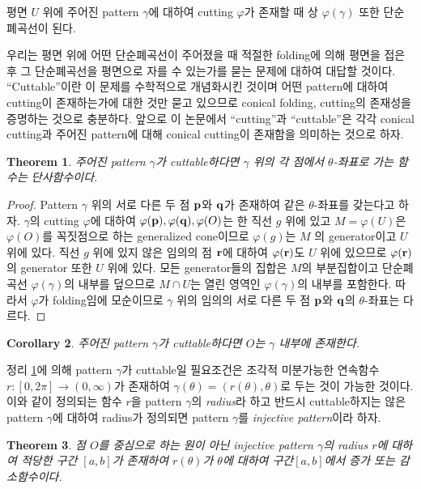 \documentclass{amsart}
\theoremstyle{plain}
\newtheorem{theorem}{Theorem}[section]
\newtheorem{corollary}[theorem]{Corollary}
\theoremstyle{definition}
\theoremstyle{remark}
\begin{document}
평면 $U$ 위에 주어진 pattern $\gamma$에 대하여 cutting $\varphi$가 존재할 때 상 $\varphi(\gamma)$ 또한 단순폐곡선이 된다.

우리는 평면 위에 어떤 단순폐곡선이 주어졌을 때 적절한 folding에 의해 평면을 접은 후 그 단순폐곡선을 평면으로 자를 수 있는가를 묻는 문제에 대하여 대답할 것이다.
``Cuttable''이란 이 문제를 수학적으로 개념화시킨 것이며 어떤 pattern에 대하여 cutting이 존재하는가에 대한 것만 묻고 있으므로 conical folding, cutting의 존재성을 증명하는 것으로 충분하다.
앞으로 이 논문에서 ``cutting''과 ``cuttable''은 각각 conical cutting과 주어진 pattern에 대해 conical cutting이 존재함을 의미하는 것으로 하자.

\begin{theorem}\label{nec1}%
주어진 pattern $\gamma$가 cuttable하다면 $\gamma$ 위의 각 점에서 $\theta$-좌표로 가는 함수는 단사함수이다.
\end{theorem}

\begin{proof}
Pattern $\gamma$ 위의 서로 다른 두 점 ${\bold p}$와 ${\bold q}$가 존재하여 같은 $\theta$-좌표를 갖는다고 하자.
$\gamma$의 cutting $\varphi$에 대하여 $\varphi({\bold p}),\varphi({\bold q}),\varphi(O)$는 한 직선 $g$ 위에 있고 $M=\varphi(U)$은 $\varphi(O)$를 꼭짓점으로 하는 generalized cone이므로 $\varphi(g)$는 $M$ 의 generator이고 $U$ 위에 있다.
직선 $g$ 위에 있지 않은 임의의 점 ${\bold r}$에 대하여 $\varphi({\bold r})$도 $U$ 위에 있으므로 $\varphi({\bold r})$의 generator 또한 $U$ 위에 있다.
모든 generator들의 집합은 $M$의 부분집합이고 단순폐곡선 $\varphi(\gamma)$의 내부를 덮으므로 $M\cap U$는 열린 영역인 $\varphi(\gamma)$의 내부를 포함한다.
따라서 $\varphi$가 folding임에 모순이므로 $\gamma$ 위의 임의의 서로 다른 두 점 ${\bold p}$와 ${\bold q}$의 $\theta$-좌표는 다르다.
\end{proof}

\begin{corollary}%
주어진 pattern $\gamma$가 cuttable하다면 $O$는 $\gamma$ 내부에 존재한다.
\end{corollary}

정리 \ref{nec1}에 의해 pattern $\gamma$가 cuttable일 필요조건은 조각적 미분가능한 연속함수 $r : [0,2\pi]\to (0,\infty)$가 존재하여 $\gamma(\theta)=(r(\theta),\theta)$로 두는 것이 가능한 것이다.
이와 같이 정의되는 함수 $r$을 pattern $\gamma$의 {\it radius}라 하고 반드시 cuttable하지는 않은 pattern $\gamma$에 대하여 radius가 정의되면 pattern $\gamma$를 {\it injective pattern}이라 하자.

\begin{theorem}\label{inc}%
점 $O$를 중심으로 하는 원이 아닌 injective pattern $\gamma$의 radius $r$에 대하여 적당한 구간 $[a,b]$가 존재하여 $r(\theta)$가 $\theta$에 대하여 구간$[a,b]$에서 증가 또는 감소함수이다. 
\end{theorem}
\end{document}
